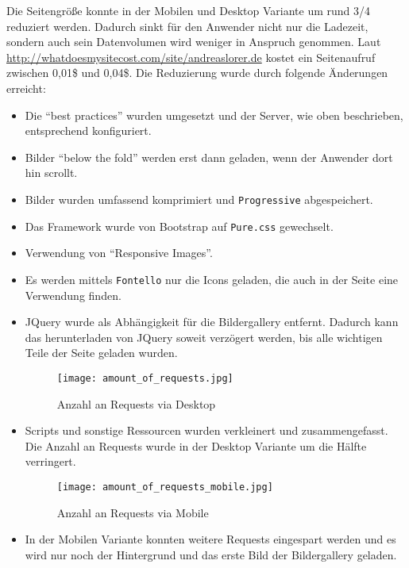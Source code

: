 		Die Seitengröße konnte in der Mobilen und Desktop Variante um rund 3/4 reduziert werden. Dadurch sinkt für den Anwender nicht nur die Ladezeit, sondern auch sein Datenvolumen wird weniger in Anspruch genommen. Laut \url{http://whatdoesmysitecost.com/site/andreaslorer.de} kostet ein Seitenaufruf zwischen 0,01\$ und 0,04\$. Die Reduzierung wurde durch folgende Änderungen erreicht: 

		\begin{itemize}
			\item Die "`best practices"' wurden umgesetzt und der Server, wie oben beschrieben, entsprechend konfiguriert.

			\item Bilder "`below the fold"' werden erst dann geladen, wenn der Anwender dort hin scrollt.

			\item Bilder wurden umfassend komprimiert und \texttt{Progressive} abgespeichert.

			\item Das Framework wurde von Bootstrap auf \texttt{Pure.css} gewechselt.

			\item Verwendung von "`Responsive Images"'.

			\item Es werden mittels \texttt{Fontello} nur die Icons geladen, die auch in der Seite eine Verwendung finden.

			\item JQuery wurde als Abhängigkeit für die Bildergallery entfernt. Dadurch kann das herunterladen von JQuery soweit verzögert werden, bis alle wichtigen Teile der Seite geladen wurden. 

			\begin{figure}[htbp]
				\begin{center}
					\texttt{[image: amount\_of\_requests.jpg]}
					\caption{Anzahl an Requests via Desktop}
					\label{fig:amount_of_requests}
				\end{center}
			\end{figure}
			\item Scripts und sonstige Ressourcen wurden verkleinert und zusammengefasst. Die Anzahl an Requests wurde in der Desktop Variante um die Hälfte verringert.

			\begin{figure}[htbp]
				\begin{center}
					\texttt{[image: amount\_of\_requests\_mobile.jpg]}
					\caption{Anzahl an Requests via Mobile}
					\label{fig:amount_of_requests_mobile}
				\end{center}
	    \end{figure}

			\item In der Mobilen Variante konnten weitere Requests eingespart werden und es wird nur noch der Hintergrund und das erste Bild der Bildergallery geladen.

		\end{itemize}

